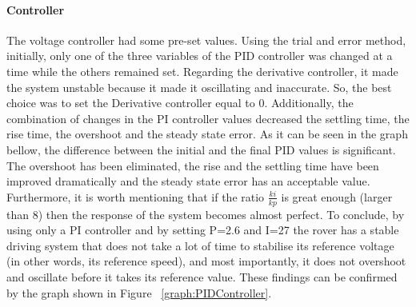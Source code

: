 \documentclass[a4paper]{article}
\begin{document}




\paragraph*{Controller}

The voltage controller had some pre-set values. Using the trial and error method, 
initially,  only one of the three variables of the PID controller was changed at 
a time while the others remained set. Regarding the derivative controller, it 
made the system unstable because it made it oscillating and inaccurate. So, 
the best choice was to set the Derivative controller equal to 0. Additionally, 
the combination of changes in the PI controller values decreased the settling 
time, the rise time, the overshoot and the steady state error. As it can be seen 
in the graph bellow, the difference between the initial and the final PID values 
is significant. The overshoot has been eliminated, the rise and the settling 
time have been improved dramatically and the steady state error has an acceptable 
value. Furthermore, it is worth mentioning that if the ratio  \( \frac{ki}{kp} \)  
is great enough (larger than 8) then the response of the system becomes almost 
perfect.
To conclude, by using only a PI controller and by setting P=2.6 and I=27 the 
rover has a stable driving system that does not take a lot of time to stabilise 
its reference voltage (in other words, its reference speed), and most importantly, 
it does not overshoot and oscillate before it takes its reference value. 
These findings can be confirmed by the graph shown in Figure ~\ref{graph:PIDController}.

\end{document}

